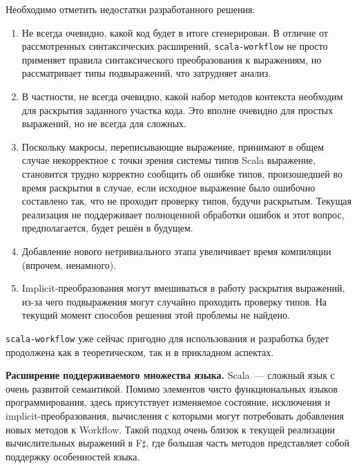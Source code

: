 Необходимо отметить недостатки разработанного решения:
\begin{enumerate}
  \item Не всегда очевидно, какой код будет в итоге сгенерирован. В отличие от рассмотренных синтаксических расширений, \texttt{scala-workflow} не просто применяет правила синтаксического преобразования к выражениям, но рассматривает типы подвыражений, что затрудняет анализ.
  \item В частности, не всегда очевидно, какой набор методов контекста необходим для раскрытия заданного участка кода. Это вполне очевидно для простых выражений, но не всегда для сложных.
  \item Поскольку макросы, переписывающие выражение, принимают в общем случае некорректное с точки зрения системы типов Scala выражение, становится трудно корректно сообщить об ошибке типов, произошедшей во время раскрытия в случае, если исходное выражение было ошибочно составлено так, что не проходит проверку типов, будучи раскрытым. Текущая реализация не поддерживает полноценной обработки ошибок и этот вопрос, предполагается, будет решён в будущем.
  \item Добавление нового нетривиального этапа увеличивает время компиляции (впрочем, ненамного).
  \item Implicit-преобразования могут вмешиваться в работу раскрытия выражений, из-за чего подвыражения могут случайно проходить проверку типов. На текущий момент способов решения этой проблемы не найдено.
\end{enumerate}

\texttt{scala-workflow} уже сейчас пригодно для использования и разработка будет продолжена как в теоретическом, так и в прикладном аспектах.

\textbf{Расширение поддерживаемого множества языка.} Scala~--- сложный язык с очень развитой семантикой. Помимо элементов чисто функциональных языков программирования, здесь присутствует изменяемое состояние, исключения и implicit-преобразования, вычисления с которыми могут потребовать добавления новых методов к \<Workflow\>. Такой подход очень близок к текущей реализации вычислительных выражений в F$\sharp$, где большая часть методов представляет собой поддержку особенностей языка.

